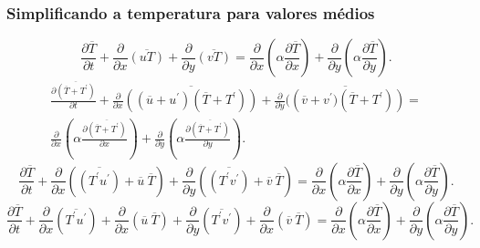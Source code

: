 \documentclass[xcolor=dvipsnames,10pt,aspectratio=169]{beamer}
\begin{document}
		\begin{frame}
		\frametitle{Simplificando a temperatura para valores médios}
		\begin{equation}
		\frac{\partial \overline{T}}{\partial t} + {\frac{\partial{}}{\partial{x}} \overline{(u T)}} + 
		{\frac{\partial{}}{\partial{y}} \overline{(v T)}} 
		=
		{\frac{\partial{}}{\partial{x}}} \left(\alpha {\frac{\partial{\overline{T}}}{\partial{x}}} \right) +
		{\frac{\partial{}}{\partial{y}}} \left(\alpha {\frac{\partial{\overline{T}}}{\partial{y}}} \right) .
		\end{equation}
		\begin{equation}
		\begin{split}
		\frac{\partial \overline{(\overline{T} + T^\prime)}}{\partial t} +{\frac{\partial{}}{\partial{x}} \overline{\left((\overline{u} + u^\prime)  (\overline{T} + T^\prime) \right)}} + 
		{\frac{\partial{}}{\partial{y}} \overline{(\left(\overline{v} + v^\prime)  (\overline{T} + T^\prime) \right)}} 
		= \\
		{\frac{\partial{}}{\partial{x}}} \left(\alpha {\frac{\partial{\overline{(\overline{T} + T^\prime)}}}{\partial{x}}} \right) +
		{\frac{\partial{}}{\partial{y}}} \left(\alpha {\frac{\partial{\overline{(\overline{T} + T^\prime)}}}{\partial{y}}} \right) .
		\end{split}
		\end{equation}
		\begin{equation}
		\frac{\partial \overline{T}}{\partial t} +\frac{\partial{}}{\partial{x}} \left(\overline{\left({T^\prime u^\prime}\right)} + \overline{u} \ \overline{T}\right)     + 
		\frac{\partial{}}{\partial{y}} \left(\overline{\left({T^\prime v^\prime}\right)} + \overline{v} \ \overline{T}\right) 
		=
		{\frac{\partial{}}{\partial{x}}} \left(\alpha {\frac{\partial{\overline{T}}}{\partial{x}}} \right) +
		{\frac{\partial{}}{\partial{y}}} \left(\alpha {\frac{\partial{\overline{T}}}{\partial{y}}} \right) .
		\end{equation}
		\begin{equation}\label{equation_preparede}
		\frac{\partial \overline{T}}{\partial t} +\frac{\partial{}}{\partial{x}} \left(\overline{T^\prime  u^\prime}\right) + \frac{\partial{}}{\partial{x}}\left(\overline{u} \ \overline{T}\right)     + 
		\frac{\partial{}}{\partial{y}} \left(\overline{T^\prime v^\prime}\right) + \frac{\partial{}}{\partial{x}}\left(\overline{v} \ \overline{T}\right) 
		=
		{\frac{\partial{}}{\partial{x}}} \left(\alpha {\frac{\partial{\overline{T}}}{\partial{x}}} \right) +
		{\frac{\partial{}}{\partial{y}}} \left(\alpha {\frac{\partial{\overline{T}}}{\partial{y}}} \right) .
		\end{equation}
		\end{frame}
		
\end{document}
